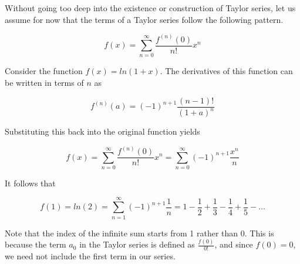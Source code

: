 \documentclass{article}
\begin{document}
Without going too deep into the existence or construction of Taylor series, let us assume for now that the terms of a Taylor series follow the following pattern. 

\begin{equation}
    f(x) = \sum_{n=0}^\infty \frac{f^{(n)}(0)}{n!} x^n
\end{equation}

Consider the function $f(x) = ln(1+x)$. The derivatives of this function can be written in terms of $n$ as

\begin{equation}
    f^{(n)}(a) = (-1)^{n+1}\frac{(n-1)!}{(1+a)^n}
\end{equation}

Substituting this back into the original function yields

\begin{equation}
    f(x) = \sum_{n=0}^\infty \frac{f^{(n)}(0)}{n!} x^n = \sum_{n=0}^\infty (-1)^{n+1}\frac{x^n}{n}
\end{equation}

It follows that

\begin{equation}
    f(1) = ln(2) = \sum_{n=1}^\infty (-1)^{n+1}\frac{1}{n} = 1 - \frac{1}{2} + \frac{1}{3} - \frac{1}{4} + \frac{1}{5} - \dots 
\end{equation}

Note that the index of the infinite sum starts from 1 rather than 0. This is because the term $a_0$ in the Taylor series is defined as $\frac{f(0)}{0!}$, and since $f(0) = 0$, we need not include the first term in our series. 
\end{document}
